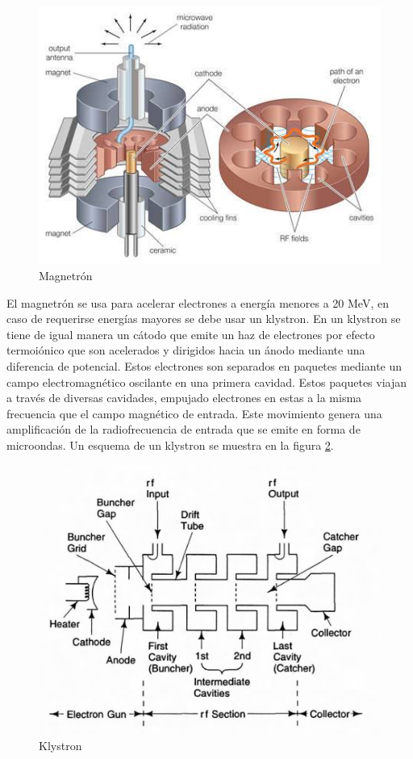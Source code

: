 \begin{figure}[H]
	\centering
	\includegraphics[width=0.7\linewidth]{images/magnetron.jpg}
	\caption{Magnetrón}
	\label{fig:magnetron}
\end{figure}

El magnetrón se usa para acelerar electrones a energía menores a 20 MeV, en caso de requerirse energías mayores se debe usar un klystron. En un klystron se tiene de igual manera un cátodo que emite un haz de electrones por efecto termoiónico que son acelerados y dirigidos hacia un ánodo mediante una diferencia de potencial. Estos electrones son separados en paquetes mediante un campo electromagnético oscilante en una primera cavidad. Estos paquetes viajan a través de diversas cavidades, empujado electrones en estas a la misma frecuencia que el campo magnético de entrada. Este movimiento genera una amplificación de la radiofrecuencia de entrada que se emite en forma de microondas. Un esquema de un klystron se muestra en la figura \ref{fig:klystron}.\\

\begin{figure}[H]
	\centering
	\includegraphics[width=0.7\linewidth]{images/klystron.png}
	\caption{Klystron\cite{karzmark1993medical}}
	\label{fig:klystron}
\end{figure}

